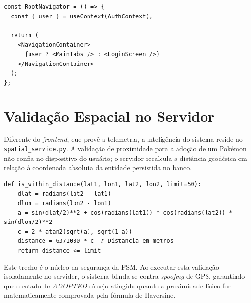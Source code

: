 \begin{lstlisting}[style=estiloJS, caption={Navegação condicional baseada no contexto de autenticação}]
const RootNavigator = () => {
  const { user } = useContext(AuthContext);

  return (
    <NavigationContainer>
      {user ? <MainTabs /> : <LoginScreen />}
    </NavigationContainer>
  );
};
\end{lstlisting}

\section{Validação Espacial no Servidor}

Diferente do \textit{frontend}, que provê a telemetria, a inteligência do sistema reside no \texttt{spatial\_service.py}. A validação de proximidade para a adoção de um Pokémon não confia no dispositivo do usuário; o servidor recalcula a distância geodésica em relação à coordenada absoluta da entidade persistida no banco.

\begin{lstlisting}[style=estiloPython, caption={Validação de proximidade via Haversine no servidor}]
def is_within_distance(lat1, lon1, lat2, lon2, limit=50):
    dlat = radians(lat2 - lat1)
    dlon = radians(lon2 - lon1)
    a = sin(dlat/2)**2 + cos(radians(lat1)) * cos(radians(lat2)) * sin(dlon/2)**2
    c = 2 * atan2(sqrt(a), sqrt(1-a))
    distance = 6371000 * c  # Distancia em metros
    return distance <= limit
\end{lstlisting}

Este trecho é o núcleo da segurança da FSM. Ao executar esta validação isoladamente no servidor, o sistema blinda-se contra \textit{spoofing} de GPS, garantindo que o estado de \textit{ADOPTED} só seja atingido quando a proximidade física for matematicamente comprovada pela fórmula de Haversine.